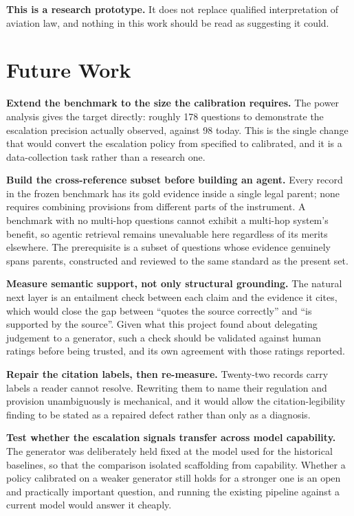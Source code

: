 \textbf{This is a research prototype.} It does not replace qualified
interpretation of aviation law, and nothing in this work should be read as
suggesting it could.

\section{Future Work}

\textbf{Extend the benchmark to the size the calibration requires.} The power
analysis gives the target directly: roughly 178 questions to demonstrate the
escalation precision actually observed, against 98 today. This is the single
change that would convert the escalation policy from specified to calibrated, and
it is a data-collection task rather than a research one.

\textbf{Build the cross-reference subset before building an agent.} Every record
in the frozen benchmark has its gold evidence inside a single legal parent; none
requires combining provisions from different parts of the instrument. A benchmark
with no multi-hop questions cannot exhibit a multi-hop system's benefit, so
agentic retrieval remains unevaluable here regardless of its merits elsewhere.
The prerequisite is a subset of questions whose evidence genuinely spans parents,
constructed and reviewed to the same standard as the present set.

\textbf{Measure semantic support, not only structural grounding.} The natural
next layer is an entailment check between each claim and the evidence it cites,
which would close the gap between \enquote{quotes the source correctly} and
\enquote{is supported by the source}. Given what this project found about
delegating judgement to a generator, such a check should be validated against
human ratings before being trusted, and its own agreement with those ratings
reported.

\textbf{Repair the citation labels, then re-measure.} Twenty-two records carry
labels a reader cannot resolve. Rewriting them to name their regulation and
provision unambiguously is mechanical, and it would allow the citation-legibility
finding to be stated as a repaired defect rather than only as a diagnosis.

\textbf{Test whether the escalation signals transfer across model capability.}
The generator was deliberately held fixed at the model used for the historical
baselines, so that the comparison isolated scaffolding from capability. Whether a
policy calibrated on a weaker generator still holds for a stronger one is an open
and practically important question, and running the existing pipeline against a
current model would answer it cheaply.

